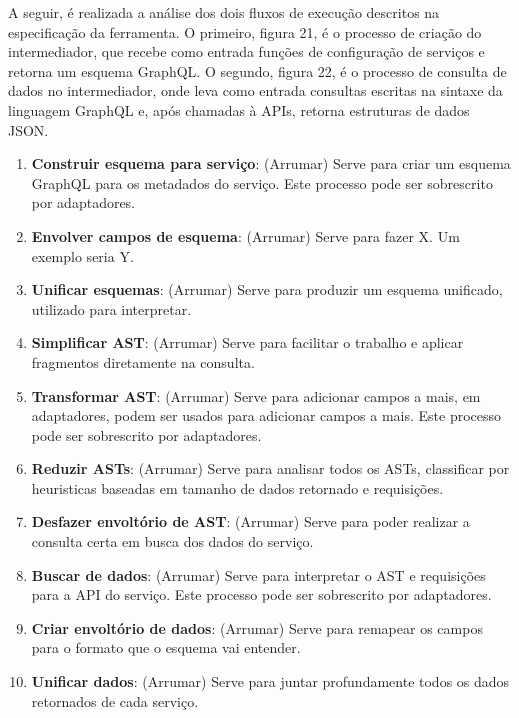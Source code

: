 A seguir, é realizada a análise dos dois fluxos de execução descritos na especificação da ferramenta. O primeiro, figura 21, é o processo de criação do intermediador, que recebe como entrada funções de configuração de serviços e retorna um esquema GraphQL. O segundo, figura 22, é o processo de consulta de dados no intermediador, onde leva como entrada consultas escritas na sintaxe da linguagem GraphQL e, após chamadas à APIs, retorna estruturas de dados JSON.

\begin{enumerate}[noitemsep]
  \item \textbf{Construir esquema para serviço}: (Arrumar) Serve para criar um esquema GraphQL para os metadados do serviço. Este processo pode ser sobrescrito por adaptadores.
  \item \textbf{Envolver campos de esquema}: (Arrumar) Serve para fazer X. Um exemplo seria Y.
  \item \textbf{Unificar esquemas}: (Arrumar) Serve para produzir um esquema unificado, utilizado para interpretar.
  \item \textbf{Simplificar AST}: (Arrumar) Serve para facilitar o trabalho e aplicar fragmentos diretamente na consulta.
  \item \textbf{Transformar AST}: (Arrumar) Serve para adicionar campos a mais, em adaptadores, podem ser usados para adicionar campos a mais. Este processo pode ser sobrescrito por adaptadores.
  \item \textbf{Reduzir ASTs}: (Arrumar) Serve para analisar todos os ASTs, classificar por heuristicas baseadas em tamanho de dados retornado e requisições.
  \item \textbf{Desfazer envoltório de AST}: (Arrumar) Serve para poder realizar a consulta certa em busca dos dados do serviço.
  \item \textbf{Buscar de dados}: (Arrumar) Serve para interpretar o AST e requisições para a API do serviço. Este processo pode ser sobrescrito por adaptadores.
  \item \textbf{Criar envoltório de dados}: (Arrumar) Serve para remapear os campos para o formato que o esquema vai entender.
  \item \textbf{Unificar dados}: (Arrumar) Serve para juntar profundamente todos os dados retornados de cada serviço.
\end{enumerate}

